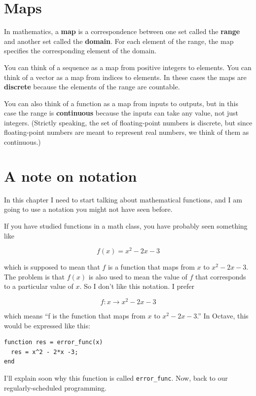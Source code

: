 \documentclass{book}
\begin{document}
\section{Maps}
\label{map}

In mathematics, a {\bf map} is a correspondence between one
set called the {\bf range} and another set called the
{\bf domain}. For each element of the range, the map specifies
the corresponding element of the domain.

You can think of a sequence as a map from positive integers
to elements. You can think of a vector
as a map from indices to elements. In these cases the maps
are {\bf discrete} because the elements of the range are countable.

You can also think of a function as a map from inputs to outputs, but
in this case the range is {\bf continuous} because the inputs can take
any value, not just integers. (Strictly speaking, the set of
floating-point numbers is discrete, but since floating-point numbers
are meant to represent real numbers, we think of them as continuous.)


\section{A note on notation}
\label{notation}

In this chapter I need to start talking about mathematical
functions, and I am going to use a notation you might not have
seen before.

If you have studied functions in a math class, you have probably
seen something like

\[ f(x) = x^2 - 2x -3 \]

which is supposed to mean that $f$ is a function that maps from
$x$ to $x^2 - 2x -3$. The problem is that $f(x)$ is also used to mean
the value of $f$ that corresponds to a particular value of $x$. So I
don't like this notation. I prefer

\[ f : x \to x^2 - 2x -3 \]

which means ``f is the function that maps from
$x$ to $x^2 - 2x -3$.'' In Octave, this would be expressed
like this:

\begin{verbatim}
function res = error_func(x)
  res = x^2 - 2*x -3;
end
\end{verbatim}

I'll explain soon why this function is called {\tt error\_func}.
Now, back to our regularly-scheduled programming.
\end{document}
